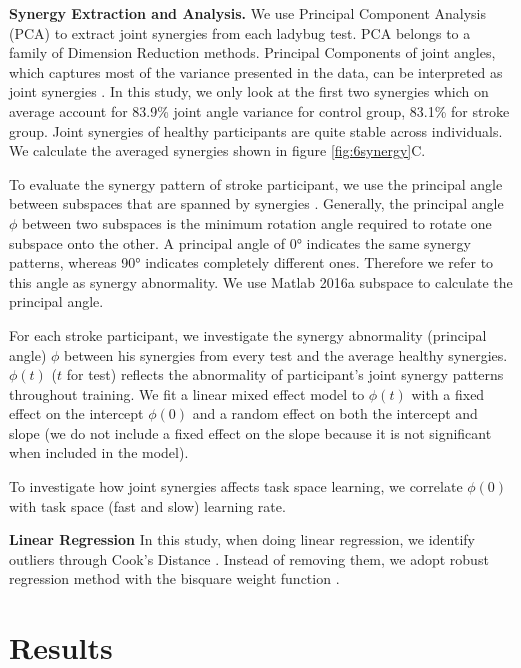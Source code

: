 \textbf{Synergy Extraction and Analysis.}
We use Principal Component Analysis (PCA) to extract joint synergies from each ladybug test.
PCA belongs to a family of Dimension Reduction methods.
Principal Components of joint angles, which captures most of the variance presented in the data, can be interpreted as joint synergies \cite{}.
In this study, we only look at the first two synergies which on average account for 83.9\% joint angle variance for control group, 83.1\% for stroke group.
Joint synergies of healthy participants are quite stable across individuals.
We calculate the averaged synergies shown in figure \ref{fig:6synergy}C.

To evaluate the synergy pattern of stroke participant, we use the principal angle \cite{} between subspaces that are spanned by synergies \cite{}.
Generally, the principal angle $ \phi $ between two subspaces is the minimum rotation angle required to rotate one subspace onto the other.
A principal angle of \ang{0} indicates the same synergy patterns, whereas \ang{90} indicates completely different ones.
Therefore we refer to this angle as synergy abnormality.
We use Matlab 2016a \textsf{subspace} \cite{} to calculate the principal angle. 

For each stroke participant, we investigate the synergy abnormality (principal angle) $ \phi $ between his synergies from every test and the average healthy synergies.
$ \phi(t) $ ($ t $ for test) reflects the abnormality of participant's joint synergy patterns throughout training. 
We fit a linear mixed effect model to $ \phi(t) $ with a fixed effect on the intercept $ \phi(0) $ and a random effect on both the intercept and slope (we do not include a fixed effect on the slope because it is not significant when included in the model).

To investigate how joint synergies affects task space learning, we correlate $ \phi(0) $ with task space (fast and slow) learning rate.

\textbf{Linear Regression}
In this study, when doing linear regression, we identify outliers through Cook's Distance \cite{}.
Instead of removing them, we adopt robust regression method with the bisquare weight function \cite{}.

\section{Results}

